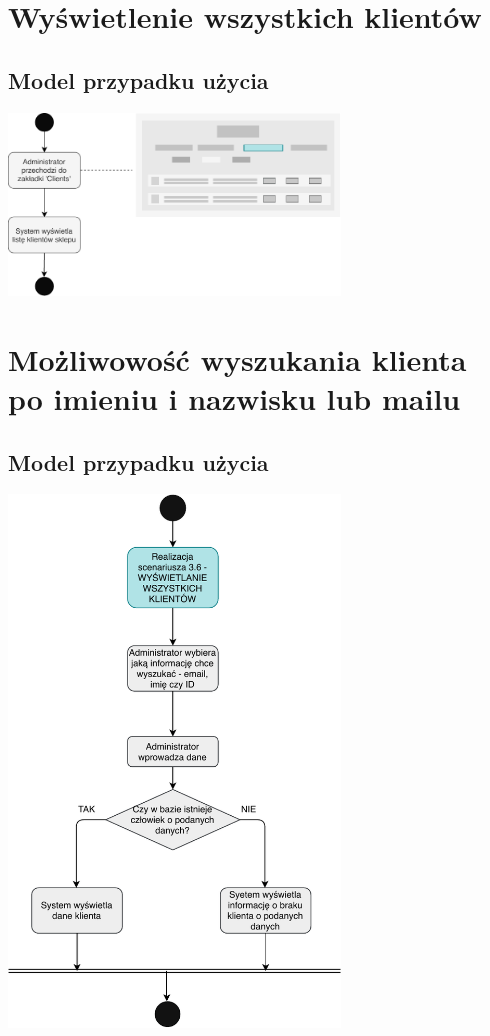 \documentclass[10pt]{report}
\begin{document}
		
	\section{Wyświetlenie wszystkich klientów}
		\subsection{Model przypadku użycia}
			\begin{center}
				\includegraphics[width=250pt]{klienci.pdf}
			\end{center}
			
		
	\section{Możliwowość wyszukania klienta po imieniu i nazwisku lub mailu}
		\subsection{Model przypadku użycia}
			\begin{center}
				\includegraphics[width=250pt]{szukaj_klienta.pdf}
			\end{center}
		
\end{document}
